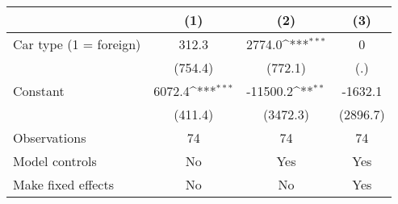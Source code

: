 {
\def\sym#1{\ifmmode^{#1}\else\(^{#1}\)\fi}
\begin{tabular}{l*{3}{c}}
\hline\hline
                &\multicolumn{1}{c}{(1)}         &\multicolumn{1}{c}{(2)}         &\multicolumn{1}{c}{(3)}         \\
\hline
Car type (1 = foreign)&    312.3         &   2774.0\sym{***}&        0         \\
                &  (754.4)         &  (772.1)         &      (.)         \\
[1em]
Constant        &   6072.4\sym{***}& -11500.2\sym{**} &  -1632.1         \\
                &  (411.4)         & (3472.3)         & (2896.7)         \\
\hline
Observations    &       74         &       74         &       74         \\
Model controls  &       No         &      Yes         &      Yes         \\
Make fixed effects&       No         &       No         &      Yes         \\
\hline\hline \end{tabular}} \begin{tablenotes} \footnotesize \item \lipsum[1] \end{tablenotes}
